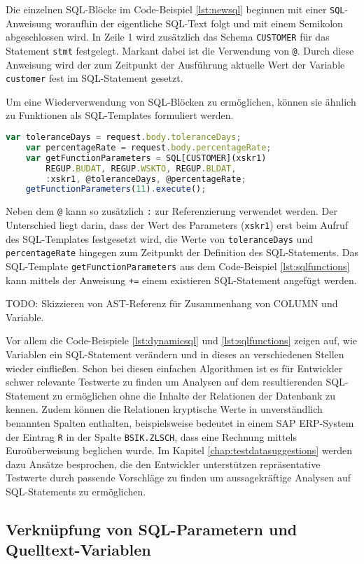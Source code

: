 Die einzelnen SQL-Blöcke im Code-Beispiel \ref{lst:newsql} beginnen mit einer \texttt{SQL}-Anweisung woraufhin der eigentliche SQL-Text folgt und mit einem Semikolon abgeschlossen wird.
In Zeile 1 wird zusätzlich das Schema \texttt{CUSTOMER} für das Statement \texttt{stmt} festgelegt.
Markant dabei ist die Verwendung von \texttt{@}.
Durch diese Anweisung wird der zum Zeitpunkt der Ausführung aktuelle Wert der Variable \texttt{customer} fest im SQL-Statement gesetzt.

Um eine Wiederverwendung von SQL-Blöcken zu ermöglichen, können sie ähnlich zu Funktionen als SQL-Templates \cite{Horschig2014} formuliert werden.

	\begin{lstlisting}[caption={SQL-Templates ermöglichen Wiederverwendung}, label={lst:sqlfunctions}, language=JavaScript]
	var toleranceDays = request.body.toleranceDays;
	var percentageRate = request.body.percentageRate;
	var getFunctionParameters = SQL[CUSTOMER](xskr1)
		REGUP.BUDAT, REGUP.WSKTO, REGUP.BLDAT,
		:xskr1, @toleranceDays, @percentageRate;
	getFunctionParameters(11).execute();
	\end{lstlisting}

Neben dem \texttt{@} kann so zusätzlich \texttt{:} zur Referenzierung verwendet werden.
Der Unterschied liegt darin, dass der Wert des Parameters (\texttt{xskr1}) erst beim Aufruf des SQL-Templates festgesetzt wird, die Werte von \texttt{toleranceDays} und \texttt{percentageRate} hingegen zum Zeitpunkt der Definition des SQL-Statements.
Das SQL-Template \texttt{getFunctionParameters} aus dem Code-Beispiel \ref{lst:sqlfunctions} kann mittels der Anweisung \texttt{+=} einem existieren SQL-Statement angefügt werden.

TODO: Skizzieren von AST-Referenz für Zusammenhang von COLUMN und Variable.

Vor allem die Code-Beispiele \ref{lst:dynamicsql} und \ref{lst:sqlfunctions} zeigen auf, wie Variablen ein SQL-Statement verändern und in dieses an verschiedenen Stellen wieder einfließen.
Schon bei diesen einfachen Algorithmen ist es für Entwickler schwer relevante Testwerte zu finden um Analysen auf dem resultierenden SQL-Statement zu ermöglichen ohne die Inhalte der Relationen der Datenbank zu kennen.
Zudem können die Relationen kryptische Werte in unverständlich benannten Spalten enthalten, beispielsweise bedeutet in einem SAP ERP-System der Eintrag \texttt{R} in der Spalte \texttt{BSIK.ZLSCH}, dass eine Rechnung mittels Euroüberweisung beglichen wurde.
Im Kapitel \ref{chap:testdatasuggestions} werden dazu Ansätze besprochen, die den Entwickler unterstützen repräsentative Testwerte durch passende Vorschläge zu finden um aussagekräftige Analysen auf SQL-Statements zu ermöglichen.

\subsection{Verkn{\"u}pfung von SQL-Parametern und Quelltext-Variablen}
